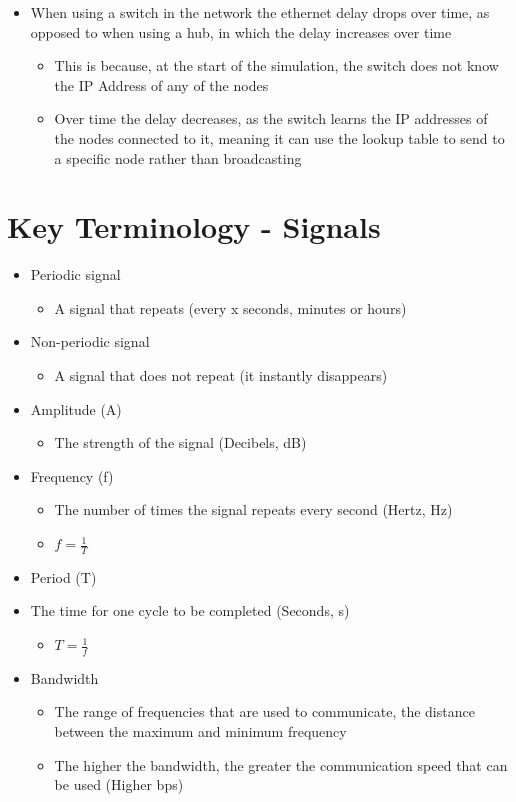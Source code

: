 
\begin{itemize}
  \item When using a switch in the network the ethernet delay drops over time, as opposed to when using a hub, in which the delay increases over time
  \begin{itemize}
    \item This is because, at the start of the simulation, the switch does not know the IP Address of any of the nodes
    \item Over time the delay decreases, as the switch learns the IP addresses of the nodes connected to it, meaning it can use the lookup table to send to a specific node rather than broadcasting
  \end{itemize}
\end{itemize}
    
\section{Key Terminology - Signals}

\begin{itemize}
  \item Periodic signal
  \begin{itemize}
    \item A signal that repeats (every x seconds, minutes or hours)
  \end{itemize}
  \item Non-periodic signal
  \begin{itemize}
    \item A signal that does not repeat (it instantly disappears)
  \end{itemize}
  \item Amplitude (A)
  \begin{itemize}
    \item The strength of the signal (Decibels, dB)
  \end{itemize}
  \item Frequency (f)
  \begin{itemize}
    \item The number of times the signal repeats every second (Hertz, Hz)
    \item \large{$f = \frac{1}{T}$}
  \end{itemize}
  \item Period (T)
  \item The time for one cycle to be completed (Seconds, s)
  \begin{itemize}
    \item \large{$T = \frac{1}{f}$}
  \end{itemize}
  \item Bandwidth
  \begin{itemize}
    \item The range of frequencies that are used to communicate, the distance between the maximum and minimum frequency
    \item The higher the bandwidth, the greater the communication speed that can be used (Higher bps)
  \end{itemize}
\end{itemize}